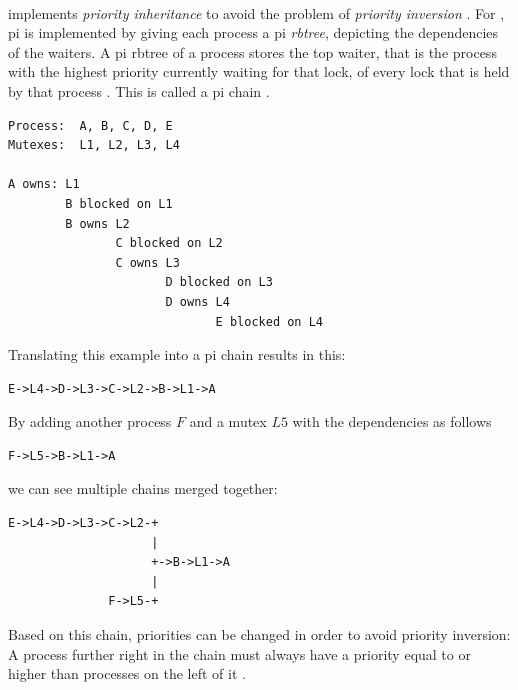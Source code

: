 \documentclass[10pt,twocolumn,a4paper]{article}
\begin{document}
\paragraph{} implements \emph{priority inheritance} to avoid the problem of \emph{priority inversion} \cite{rostedt_rtmutex_2017}.
For , \acrfull{pi} is implemented by giving each process a \acrshort{pi} \emph{rbtree}, depicting the dependencies of the waiters.
A \acrshort{pi} rbtree of a process stores the top waiter, that is the process with the highest priority currently waiting for that lock, of every lock that is held by that process \cite{rostedt_rtmutex_2017}.
This is called a \acrshort{pi} chain \cite{rostedt_rtmutex_2017}.
\lstset{basicstyle=\small}
\begin{lstlisting}[caption={Example from \cite{rostedt_rtmutex_2017}}]
Process:  A, B, C, D, E
Mutexes:  L1, L2, L3, L4

A owns: L1
        B blocked on L1
        B owns L2
               C blocked on L2
               C owns L3
                      D blocked on L3
                      D owns L4
                             E blocked on L4
\end{lstlisting}
Translating this example into a \acrshort{pi} chain results in this:
\begin{lstlisting}[caption={Simple \acrshort{pi} chain \cite{rostedt_rtmutex_2017}}]
E->L4->D->L3->C->L2->B->L1->A
\end{lstlisting}
By adding another process $F$ and a mutex $L5$ with the dependencies as follows
\begin{lstlisting}[caption={Second \acrshort{pi} chain \cite{rostedt_rtmutex_2017}}]
F->L5->B->L1->A
\end{lstlisting}
we can see multiple chains merged together:
\begin{lstlisting}[caption={\acrshort{pi} chain \cite{rostedt_rtmutex_2017}}]
E->L4->D->L3->C->L2-+
                    |
                    +->B->L1->A
                    |
              F->L5-+
\end{lstlisting}
Based on this chain, priorities can be changed in order to avoid priority inversion:
A process further right in the chain must always have a priority equal to or higher than processes on the left of it \cite{rostedt_rtmutex_2017}.
\newline
\end{document}
